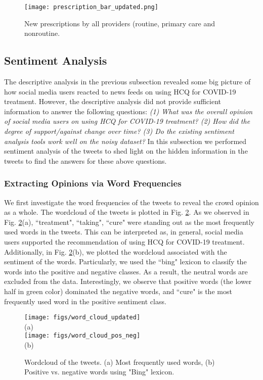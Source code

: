 \documentclass[conference]{IEEEtran}
\begin{document}
	\begin{figure}[tb]
		\centering 
		\texttt{[image: prescription\_bar\_updated.png]} 
		\caption{New prescriptions by all providers (routine, primary care and nonroutine.}
		\label{fig:3_prescriptions_bar}
		\vspace{-0.2in}
	\end{figure}
	
	\subsection{Sentiment Analysis}
	The descriptive analysis in the previous subsection revealed some big picture of how social media users reacted to news feeds on using HCQ for COVID-19 treatment. However, the descriptive analysis did not provide sufficient information to answer the following questions: \textit{ (1) What was the overall opinion of social media users on using HCQ for COVID-19 treatment? (2) How did the degree of support/against change over time? (3) Do the existing sentiment analysis tools work well on the noisy dataset?} In this subsection we performed sentiment analysis of the tweets to shed light on the hidden information in the tweets to find the answers for these above questions. 
	
	\subsubsection{Extracting Opinions via Word Frequencies}
	We first investigate the word frequencies of the tweets to reveal the crowd opinion as a whole. The wordcloud of the tweets is plotted in Fig. \ref{fig:wordcloudposneg}. As we observed in Fig. \ref{fig:wordcloudposneg}(a), ``treatment",  ``taking", ``cure" were standing out as the most frequently used words in the tweets. This can be interpreted as, in general, social media users supported the recommendation of using HCQ for COVID-19 treatment. Additionally, in Fig. \ref{fig:wordcloudposneg}(b), we plotted the wordcloud associated with the sentiment of the words. Particularly, we used the ``bing" lexicon \cite{b20} to classify the words into the positive and negative classes. As a result, the neutral words are excluded from the data. Interestingly, we observe that positive words (the lower half in green color) dominated the negative words, and ``cure" is the most frequently used word in the positive sentiment class.
	
	
	\begin{figure}
		\centering
		\texttt{[image: figs/word\_cloud\_updated]} \\
		(a) \\
		\texttt{[image: figs/word\_cloud\_pos\_neg]} \\
		(b)
		\caption{Wordcloud of the tweets. (a) Most frequently used words, (b) Positive vs. negative words using "Bing" lexicon.}
		\label{fig:wordcloudposneg}
		\vspace{-0.2in}
	\end{figure}
	
\end{document}
